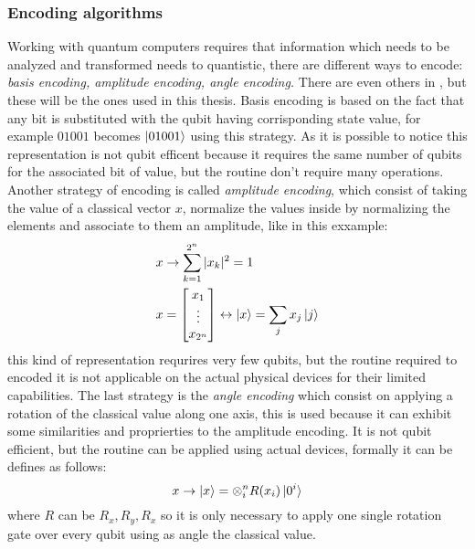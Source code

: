 \subsubsection{Encoding algorithms}
Working with quantum computers requires that information which needs to be analyzed and transformed needs to quantistic, there are different ways to encode: \textit{basis encoding, amplitude encoding, angle encoding.} There are even others in \cite{Schuld2021}, but these will be the ones used in this thesis.
Basis encoding is based on the fact that any bit is substituted with the qubit having corrisponding state value, for example $01001$ becomes $\ket{01001}$ using this strategy. As it is possible to notice this representation is not qubit efficent because it requires the same number of qubits for the associated bit of value, but the routine don't require many operations. Another strategy of encoding is called \textit{amplitude encoding}, which consist of taking the value of a classical vector $x$, normalize the values inside by normalizing the elements and associate to them an amplitude, like in this exxample:
\begin{align*}
	& x \to \sum_{k=1}^{2^n}|x_k| ^ 2 = 1 \\
	&x = \begin{bmatrix}
		x_1 \\
		\vdots \\
		x_{2^n}
	\end{bmatrix}
	 \leftrightarrow
	 \ket{x} = \sum_{j} x_j \ket{j}
\end{align*}
this kind of representation requrires very few qubits, but the routine required to encoded it is not applicable on the actual physical devices for their limited capabilities. The last strategy is the \textit{angle encoding} which consist on applying a rotation of the classical value along one axis, this is used because it can exhibit some similarities and proprierties to the amplitude encoding. It is not qubit efficient, but the routine can be applied using actual devices, formally it can be defines as follows:
\begin{equation*}
	x \to \ket{x} = \otimes_{i}^{n} R(x_i) \ket{0^i}
\end{equation*}
where $R$ can be $R_x, R_y, R_x$ so it is only necessary to apply one single rotation gate over every qubit using as angle the classical value.
